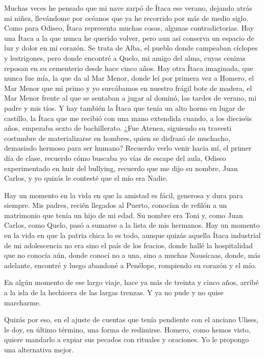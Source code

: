 Muchas veces he pensado que mi nave zarpó de Ítaca ese verano, dejando atrás mi niñez, llevándome por océanos que ya he recorrido por más de medio siglo. Como para Odiseo, Ítaca representa muchas cosas, algunas contradictorias. Hay una Ítaca a la que nunca he querido volver, pero aun así conserva un espacio de luz y dolor en mi corazón. Se trata de Alba, el pueblo donde campeaban cíclopes y lestrigones, pero donde encontré a Quelo, mi amigo del alma, cuyas cenizas reposan en su cementerio desde hace cinco años. Hay otra Ítaca imaginada, que nunca fue mía, la que da al Mar Menor, donde leí por primera vez a Homero, el Mar Menor que mi primo y yo surcábamos en nuestro frágil bote de madera, el Mar Menor frente al que se sentaban a jugar al dominó, las tardes de verano, mi padre y mis tíos. Y hay también la Ítaca que tenía un alto horno en lugar de castillo, la Ítaca que me recibió con una mano extendida cuando, a los dieciséis años, empezaba sexto de bachillerato. ¿Fue Atenea, siguiendo su travesti costumbre de materializarse en hombres, quien se disfrazó de muchacho, demasiado hermoso para ser humano? Recuerdo verlo venir hacia mí, el primer día de clase, recuerdo cómo buscaba yo vías de escape del aula, Odiseo experimentado en huir del bullying, recuerdo que me dijo su nombre, Juan Carlos, y yo quizás le contesté que el mío era Nadie.

Hay un momento en la vida en que la amistad es fácil, generosa y dura para siempre. Mis padres, recién llegados al Puerto, conocían de refilón a un matrimonio que tenía un hijo de mi edad. Su nombre era Toni y, como Juan Carlos, como Quelo, pasó a sumarse a la lista de mis hermanos. Hay un momento en la vida en que la patria chica lo es todo, aunque quizás aquella Ítaca industrial de mi adolescencia no era sino el país de los feacios, donde hallé la hospitalidad que no conocía aún, donde conocí no a una, sino a muchas Nausícaas, donde, más adelante, encontré y luego abandoné a Penélope, rompiendo su corazón y el mío.

En algún momento de ese largo viaje, hace ya más de treinta y cinco años, arribé a la isla de la hechicera de las largas trenzas. Y ya no pude y no quise marcharme.

Quizás por eso, en el ajuste de cuentas que tenía pendiente con el anciano Ulises, le doy, en último término, una forma de redimirse. Homero, como hemos visto, quiere mandarlo a expiar sus pecados con rituales y oraciones. Yo le propongo una alternativa mejor.

